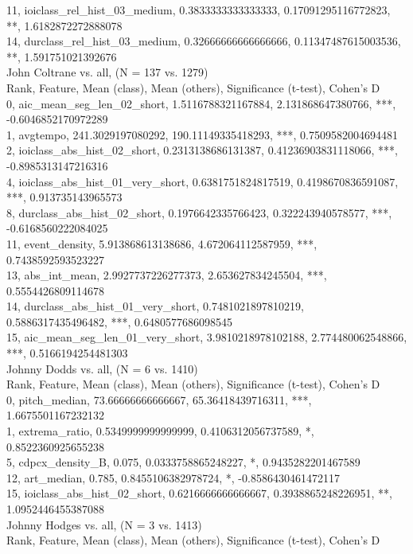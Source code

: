 11, ioiclass_rel_hist_03_medium, 0.3833333333333333, 0.17091295116772823, **, 1.6182872272888078\\
14, durclass_rel_hist_03_medium, 0.32666666666666666, 0.11347487615003536, **, 1.591751021392676\\
John Coltrane vs. all, (N = 137 vs. 1279)\\
Rank, Feature, Mean (class), Mean (others), Significance (t-test), Cohen's D\\
0, aic_mean_seg_len_02_short, 1.5116788321167884, 2.131868647380766, ***, -0.6046852170972289\\
1, avgtempo, 241.3029197080292, 190.11149335418293, ***, 0.7509582004694481\\
2, ioiclass_abs_hist_02_short, 0.2313138686131387, 0.41236903831118066, ***, -0.8985313147216316\\
4, ioiclass_abs_hist_01_very_short, 0.6381751824817519, 0.4198670836591087, ***, 0.913735143965573\\
8, durclass_abs_hist_02_short, 0.1976642335766423, 0.322243940578577, ***, -0.6168560222084025\\
11, event_density, 5.913868613138686, 4.672064112587959, ***, 0.7438592593523227\\
13, abs_int_mean, 2.9927737226277373, 2.653627834245504, ***, 0.5554426809114678\\
14, durclass_abs_hist_01_very_short, 0.7481021897810219, 0.5886317435496482, ***, 0.6480577686098545\\
15, aic_mean_seg_len_01_very_short, 3.9810218978102188, 2.774480062548866, ***, 0.5166194254481303\\
Johnny Dodds vs. all, (N = 6 vs. 1410)\\
Rank, Feature, Mean (class), Mean (others), Significance (t-test), Cohen's D\\
0, pitch_median, 73.66666666666667, 65.36418439716311, ***, 1.6675501167232132\\
1, extrema_ratio, 0.5349999999999999, 0.4106312056737589, *, 0.8522360925655238\\
5, cdpcx_density_B, 0.075, 0.0333758865248227, *, 0.9435282201467589\\
12, art_median, 0.785, 0.8455106382978724, *, -0.8586430461472117\\
15, ioiclass_abs_hist_02_short, 0.6216666666666667, 0.3938865248226951, **, 1.0952446455387088\\
Johnny Hodges vs. all, (N = 3 vs. 1413)\\
Rank, Feature, Mean (class), Mean (others), Significance (t-test), Cohen's D\\
